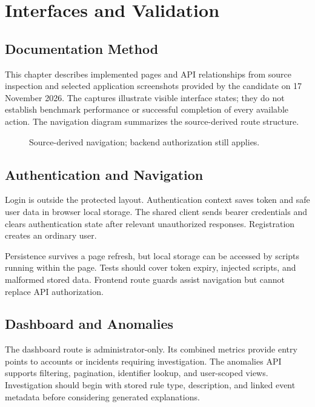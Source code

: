 \chapter{Interfaces and Validation}
\section{Documentation Method}
This chapter describes implemented pages and API relationships from source inspection and selected application screenshots provided by the candidate on 17 November 2026. The captures illustrate visible interface states; they do not establish benchmark performance or successful completion of every available action. The navigation diagram summarizes the source-derived route structure.
\begin{figure}[htbp]\centering{}\caption{Source-derived navigation; backend authorization still applies.}\end{figure}

\section{Authentication and Navigation}
Login is outside the protected layout. Authentication context saves token and safe user data in browser local storage. The shared client sends bearer credentials and clears authentication state after relevant unauthorized responses. Registration creates an ordinary user.

Persistence survives a page refresh, but local storage can be accessed by scripts running within the page. Tests should cover token expiry, injected scripts, and malformed stored data. Frontend route guards assist navigation but cannot replace API authorization.

\section{Dashboard and Anomalies}
The dashboard route is administrator-only. Its combined metrics provide entry points to accounts or incidents requiring investigation. The anomalies API supports filtering, pagination, identifier lookup, and user-scoped views. Investigation should begin with stored rule type, description, and linked event metadata before considering generated explanations.

